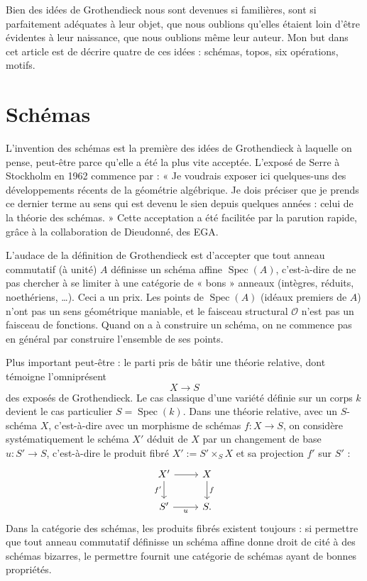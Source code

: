 \documentclass[11pt]{article}
\begin{document}
Bien des idées de Grothendieck nous sont devenues si familières, sont si parfaitement adéquates à leur objet, que nous oublions qu'elles étaient loin d'être évidentes à leur naissance, que nous oublions même leur auteur. Mon but dans cet article est de décrire quatre de ces idées : schémas, topos, six opérations, motifs.

\section{Schémas}

L'invention des schémas est la première des idées de Grothendieck à laquelle on pense, peut-être parce qu'elle a été la plus vite acceptée. L'exposé de Serre à Stockholm en 1962 commence par : « Je voudrais exposer ici quelques-uns des développements récents de la géométrie algébrique. Je dois préciser que je prends ce dernier terme au sens qui est devenu le sien depuis quelques années : celui de la théorie des schémas. » Cette acceptation a été facilitée par la parution rapide, grâce à la collaboration de Dieudonné, des EGA.

L'audace de la définition de Grothendieck est d'accepter que tout anneau commutatif (à unité) \(A\) définisse un schéma affine \(\operatorname{Spec}(A)\), c'est-à-dire de ne pas chercher à se limiter à une catégorie de « bons » anneaux (intègres, réduits, noethériens, \ldots). Ceci a un prix. Les points de \(\operatorname{Spec}(A)\) (idéaux premiers de \(A\)) n'ont pas un sens géométrique maniable, et le faisceau structural \(\mathcal O\) n'est pas un faisceau de fonctions. Quand on a à construire un schéma, on ne commence pas en général par construire l'ensemble de ses points.

Plus important peut-être : le parti pris de bâtir une théorie relative, dont témoigne l'omniprésent
\[
  X \longrightarrow S
\]
des exposés de Grothendieck. Le cas classique d'une variété définie sur un corps \(k\) devient le cas particulier \(S=\operatorname{Spec}(k)\). Dans une théorie relative, avec un \(S\)-schéma \(X\), c'est-à-dire avec un morphisme de schémas \(f:X\to S\), on considère systématiquement le schéma \(X'\) déduit de \(X\) par un changement de base \(u:S'\to S\), c'est-à-dire le produit fibré \(X':=S'\times_S X\) et sa projection \(f'\) sur \(S'\) :
\[
\begin{tikzcd}
X' \arrow[r] \arrow[d,"f'"'] & X \arrow[d,"f"]\\
S' \arrow[r,"u"'] & S .
\end{tikzcd}
\]
Dans la catégorie des schémas, les produits fibrés existent toujours : si permettre que tout anneau commutatif définisse un schéma affine donne droit de cité à des schémas bizarres, le permettre fournit une catégorie de schémas ayant de bonnes propriétés.
\end{document}
